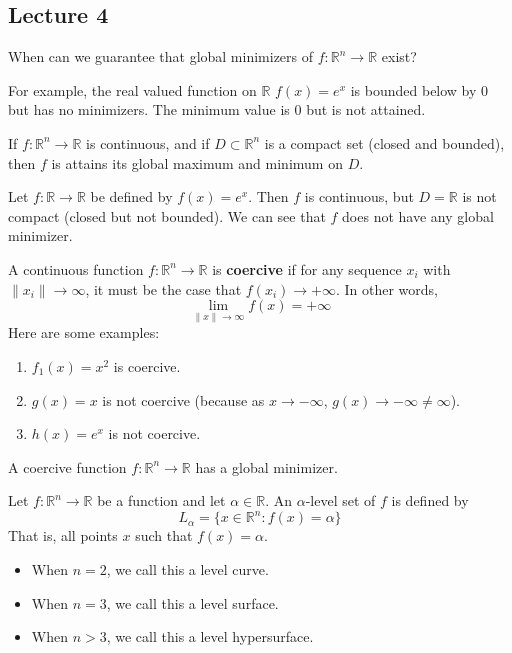 \subsection{Lecture 4}


\begin{problem}[Motivation]
  When can we guarantee that global minimizers of $f: \mathbb R^n \rightarrow \mathbb R$ exist?

  For example, the real valued function on $\mathbb R$ $f(x) = e^x$ is bounded below by 0 but has no minimizers. The minimum value is 0 but is not attained.
\end{problem}
\begin{proposition}
  If $f: \mathbb R^n \rightarrow \mathbb R$ is continuous, and if $D \subset \mathbb R^n$ is a compact set (closed and bounded), then $f$ is attains its global maximum and minimum on $D$.
\end{proposition}
\begin{problem}
  Let $f: \mathbb R \rightarrow \mathbb R$ be defined by $f(x) = e^x$. Then $f$ is continuous, but $D = \mathbb R$ is not compact (closed but not bounded). We can see that $f$ does not have any global minimizer.
  
\end{problem}
\begin{definition}
  A continuous function $f: \mathbb R^n \rightarrow \mathbb R$ is \textbf{coercive} if for any sequence $x_i$ with $\|x_i \| \rightarrow \infty$, it must be the case that $f(x_i) \rightarrow +\infty$. In other words, $$\lim_{\|x\| \rightarrow \infty} f(x) = +\infty$$
  Here are some examples:
  \begin{enumerate}
    \item $f_1(x) = x^2$ is coercive.
    \item $g(x) = x$ is not coercive (because as $x \rightarrow -\infty$, $g(x) \rightarrow -\infty \neq \infty$).
    \item $h(x) = e^x$ is not coercive.
  \end{enumerate}
\end{definition}
\begin{proposition}
  A coercive function $f: \mathbb R^n \rightarrow \mathbb R$ has a global minimizer.
\end{proposition}
\begin{definition}
  Let $f: \mathbb R^n \to \mathbb R$ be a function and let $\alpha \in \mathbb R$. An $\alpha$-level set of $f$ is defined by $$L_\alpha = \{x \in \mathbb R^n: f(x) = \alpha\}$$
  That is, all points $x$ such that $f(x) = \alpha$.
  \begin{itemize}
    \item When $n = 2$, we call this a level curve.
    \item When $n = 3$, we call this a level surface.
    \item When $n > 3$, we call this a level hypersurface.
  \end{itemize}
\end{definition}
